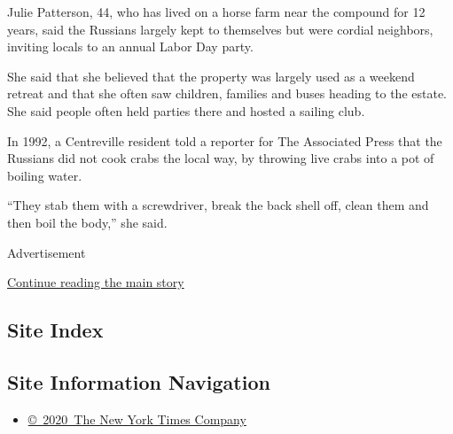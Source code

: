 Julie Patterson, 44, who has lived on a horse farm near the compound for
12 years, said the Russians largely kept to themselves but were cordial
neighbors, inviting locals to an annual Labor Day party.

She said that she believed that the property was largely used as a
weekend retreat and that she often saw children, families and buses
heading to the estate. She said people often held parties there and
hosted a sailing club.

In 1992, a Centreville resident told a reporter for The Associated Press
that the Russians did not cook crabs the local way, by throwing live
crabs into a pot of boiling water.

``They stab them with a screwdriver, break the back shell off, clean
them and then boil the body,'' she said.

Advertisement

\protect\hyperlink{after-bottom}{Continue reading the main story}

\hypertarget{site-index}{%
\subsection{Site Index}\label{site-index}}

\hypertarget{site-information-navigation}{%
\subsection{Site Information
Navigation}\label{site-information-navigation}}

\begin{itemize}
\tightlist
\item
  \href{https://help.nytimes.com/hc/en-us/articles/115014792127-Copyright-notice}{©~2020~The
  New York Times Company}
\end{itemize}

